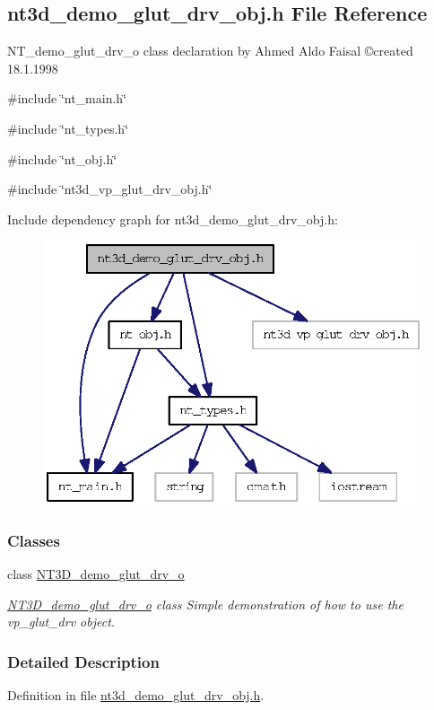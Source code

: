 \subsection{nt3d\_\-demo\_\-glut\_\-drv\_\-obj.h File Reference}
\label{nt3d__demo__glut__drv__obj_8h}



\begin{DoxyItemize}
\item NT\_\-demo\_\-glut\_\-drv\_\-o class declaration by Ahmed Aldo Faisal \copyright created 18.1.1998 
\end{DoxyItemize} 


{\ttfamily \#include \char`\"{}nt\_\-main.h\char`\"{}}\par
{\ttfamily \#include \char`\"{}nt\_\-types.h\char`\"{}}\par
{\ttfamily \#include \char`\"{}nt\_\-obj.h\char`\"{}}\par
{\ttfamily \#include \char`\"{}nt3d\_\-vp\_\-glut\_\-drv\_\-obj.h\char`\"{}}\par
Include dependency graph for nt3d\_\-demo\_\-glut\_\-drv\_\-obj.h:
\nopagebreak
\begin{figure}[H]
\begin{center}
\leavevmode
\includegraphics[width=327pt]{nt3d__demo__glut__drv__obj_8h__incl}
\end{center}
\end{figure}
\subsubsection*{Classes}
\begin{DoxyCompactItemize}
\item 
class \hyperlink{class_n_t3_d__demo__glut__drv__o}{NT3D\_\-demo\_\-glut\_\-drv\_\-o}
\begin{DoxyCompactList}\small\item\em \hyperlink{class_n_t3_d__demo__glut__drv__o}{NT3D\_\-demo\_\-glut\_\-drv\_\-o} class Simple demonstration of how to use the vp\_\-glut\_\-drv object. \item\end{DoxyCompactList}\end{DoxyCompactItemize}


\subsubsection{Detailed Description}


Definition in file \hyperlink{nt3d__demo__glut__drv__obj_8h_source}{nt3d\_\-demo\_\-glut\_\-drv\_\-obj.h}.


